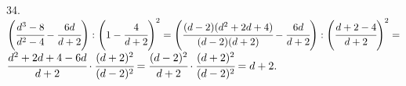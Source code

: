 34. $\left(\cfrac{d^3-8}{d^2-4}-\cfrac{6d}{d+2}\right):\left(1-\cfrac{4}{d+2}\right)^2=
\left(\cfrac{(d-2)(d^2+2d+4)}{(d-2)(d+2)}-\cfrac{6d}{d+2}\right):\left(\cfrac{d+2-4}{d+2}\right)^2=$\\$
\cfrac{d^2+2d+4-6d}{d+2}\cdot\cfrac{(d+2)^2}{(d-2)^2}=\cfrac{(d-2)^2}{d+2}\cdot\cfrac{(d+2)^2}{(d-2)^2}=d+2.$\\
